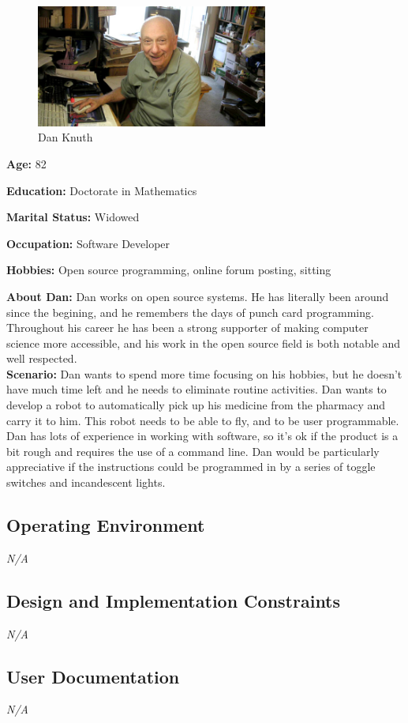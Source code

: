 \documentclass[english]{article}
\numberwithin{equation}{section} %
\begin{document}
\begin{figure}[h!]
  \centering
	\includegraphics[width=3in]{oldgradstudent.jpg}
  \caption{Dan Knuth}
\end{figure}
\textbf{ Age:} 82

\textbf{ Education:} Doctorate in Mathematics

\textbf{ Marital Status:} Widowed

\textbf{ Occupation:} Software Developer

\textbf{ Hobbies:} Open source programming, online forum posting, sitting

\textbf{About Dan:} Dan works on open source systems. He has literally been around since the begining, and he remembers the days of punch card programming. Throughout his career he has been a strong supporter of making computer science more accessible, and his work in the open source field is both notable and well respected.
\\

\textbf{Scenario:} Dan wants to spend more time focusing on his hobbies, but he doesn't have much time left and he needs to eliminate routine activities. Dan wants to develop a robot to automatically pick up his medicine from the pharmacy and carry it to him. This robot needs to be able to fly, and to be user programmable. Dan has lots of experience in working with software, so it's ok if the product is a bit rough and requires the use of a command line. Dan would be particularly appreciative if the instructions could be programmed in by a series of toggle switches and incandescent lights.

\subsection{Operating Environment}
\textit{N/A}
\subsection{Design and Implementation Constraints}
\textit{N/A}
\subsection{User Documentation}
\textit{N/A}
\end{document}
